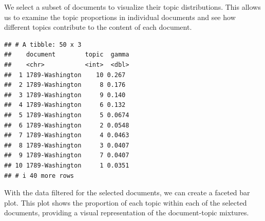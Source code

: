 \documentclass[
]{book}
\newenvironment{Shaded}{\begin{snugshade}}{\end{snugshade}}
\newcommand{\CommentTok}[1]{\textcolor[rgb]{0.56,0.35,0.01}{\textit{#1}}}
\newcommand{\DecValTok}[1]{\textcolor[rgb]{0.00,0.00,0.81}{#1}}
\newcommand{\FunctionTok}[1]{\textcolor[rgb]{0.13,0.29,0.53}{\textbf{#1}}}
\newcommand{\NormalTok}[1]{#1}
\newcommand{\OtherTok}[1]{\textcolor[rgb]{0.56,0.35,0.01}{#1}}
\newcommand{\SpecialCharTok}[1]{\textcolor[rgb]{0.81,0.36,0.00}{\textbf{#1}}}
\begin{document}
We select a subset of documents to visualize their topic distributions.
This allows us to examine the topic proportions in individual documents and see how different topics contribute to the content of each document.

\begin{Shaded}
\end{Shaded}

\begin{verbatim}
## # A tibble: 50 x 3
##    document        topic  gamma
##    <chr>           <int>  <dbl>
##  1 1789-Washington    10 0.267 
##  2 1789-Washington     8 0.176 
##  3 1789-Washington     9 0.140 
##  4 1789-Washington     6 0.132 
##  5 1789-Washington     5 0.0674
##  6 1789-Washington     2 0.0548
##  7 1789-Washington     4 0.0463
##  8 1789-Washington     3 0.0407
##  9 1789-Washington     7 0.0407
## 10 1789-Washington     1 0.0351
## # i 40 more rows
\end{verbatim}

With the data filtered for the selected documents, we can create a faceted bar plot. This plot shows the proportion of each topic within each of the selected documents, providing a visual representation of the document-topic mixtures.
\end{document}
